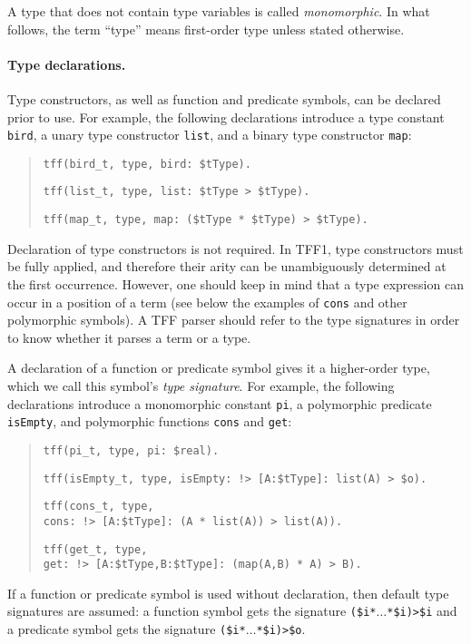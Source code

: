 A type that does not contain type variables is called
{\em monomorphic}.
In what follows, the term ``type'' means
first-order type unless stated otherwise.

\paragraph{Type declarations.} Type constructors, as well as
function and predicate symbols, can be declared prior to use.
For example, the following declarations introduce a type
constant {\tt bird}, a unary type constructor {\tt list},
and a binary type constructor {\tt map}:
\begin{quote}
\verb+tff(bird_t, type, bird: $tType).+
\par\medskip
\verb+tff(list_t, type, list: $tType > $tType).+
\par\medskip
\verb+tff(map_t, type, map: ($tType * $tType) > $tType).+
\end{quote}
Declaration of type constructors is not required. In TFF1,
type constructors must be fully applied, and therefore
their arity can be unambiguously determined at the first
occurrence. However, one should keep in mind that a type
expression can occur in a position of a term (see below
the examples of {\tt cons} and other polymorphic symbols).
A TFF parser should refer to the type signatures in order
to know whether it parses a term or a type.

A declaration of a function or predicate symbol gives it
a higher-order type, which we call this symbol's
{\em type signature}. For example, the following
declarations introduce a monomorphic constant {\tt pi},
a polymorphic predicate {\tt isEmpty}, and polymorphic
functions {\tt cons} and {\tt get}:
\begin{quote}
\verb+tff(pi_t, type, pi: $real).+
\par\medskip
\verb+tff(isEmpty_t, type, isEmpty: !> [A:$tType]: list(A) > $o).+
\par\medskip
\verb+tff(cons_t, type,+\\
\mbox{}\hfill
\verb+cons: !> [A:$tType]: (A * list(A)) > list(A)).+
\par\medskip
\verb+tff(get_t, type,+\\
\mbox{}\hfill
\verb+get: !> [A:$tType,B:$tType]: (map(A,B) * A) > B).+
\end{quote}
If a function or predicate symbol is used without declaration,
then default type signatures are assumed:
a function symbol gets the signature
{\tt (\$i\;*\;$\dots$\;*\;\$i)\;>\;\$i} and
a predicate symbol gets the signature
{\tt (\$i\;*\;$\dots$\;*\;\$i)\;>\;\$o}.

